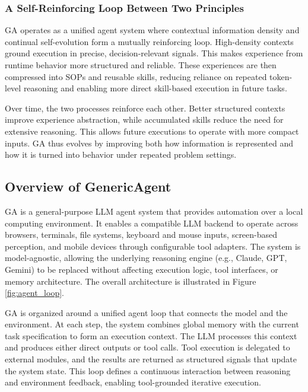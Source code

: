 \subsubsection{A Self-Reinforcing Loop Between Two Principles}

GA operates as a unified agent system where contextual information density and continual self-evolution form a mutually reinforcing loop. High-density contexts ground execution in precise, decision-relevant signals. This makes experience from runtime behavior more structured and reliable. These experiences are then compressed into SOPs and reusable skills, reducing reliance on repeated token-level reasoning and enabling more direct skill-based execution in future tasks.

Over time, the two processes reinforce each other. Better structured contexts improve experience abstraction, while accumulated skills reduce the need for extensive reasoning. This allows future executions to operate with more compact inputs. GA thus evolves by improving both how information is represented and how it is turned into behavior under repeated problem settings.



\subsection{Overview of GenericAgent}
\label{sec:overview}

GA is a general-purpose LLM agent system that provides automation over a local computing environment. It enables a compatible LLM backend to operate across browsers, terminals, file systems, keyboard and mouse inputs, screen-based perception, and mobile devices through configurable tool adapters. The system is model-agnostic, allowing the underlying reasoning engine (e.g., Claude, GPT, Gemini) to be replaced without affecting execution logic, tool interfaces, or memory architecture. The overall architecture is illustrated in Figure \ref{fig:agent_loop}.

GA is organized around a unified agent loop that connects the model and the environment. At each step, the system combines global memory with the current task specification to form an execution context. The LLM processes this context and produces either direct outputs or tool calls. Tool execution is delegated to external modules, and the results are returned as structured signals that update the system state. This loop defines a continuous interaction between reasoning and environment feedback, enabling tool-grounded iterative execution.

